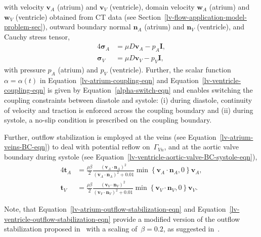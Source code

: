 \documentclass[3p]{elsarticle}
\begin{document}
with velocity $\boldsymbol{v}_A$ (atrium) and $\boldsymbol{v}_V$ (ventricle),
domain velocity $\boldsymbol{w}_A$ (atrium) and $\boldsymbol{w}_V$ (ventricle)
obtained from CT data (see Section~\ref{lv-flow-application-model-problem-sec}),
outward boundary normal $\boldsymbol{n}_A$ (atrium) and $\boldsymbol{n}_V$ (ventricle),
and Cauchy stress tensor,
\begin{alignat}{4}
    \boldsymbol{\sigma}_A
    &= \mu D \boldsymbol{v}_A - p_A \boldsymbol{I}, \\
    \boldsymbol{\sigma}_V
    &= \mu D \boldsymbol{v}_V - p_V \boldsymbol{I},
\end{alignat}
with pressure $p_A$ (atrium) and $p_V$ (ventricle).
Further, the scalar function $\alpha = \alpha (t)$ in Equation~\eqref{lv-atrium-coupling-eqn}
and Equation~\eqref{lv-ventricle-coupling-eqn}
is given by Equation~\eqref{alpha-switch-eqn}
and enables switching the coupling constraints between diastole and systole:
(i) during diastole, continuity of velocity and traction is enforced across the coupling boundary
and
(ii) during systole, a no-slip condition is prescribed on the coupling boundary.

Further, outflow stabilization is employed at the veins
(see Equation~\ref{lv-atrium-veins-BC-eqn}) to deal with potential reflow
on~$\Gamma_{Vn}$,
and at the aortic valve boundary during systole
(see Equation~\eqref{lv-ventricle-aortic-valve-BC-systole-eqn}),
\begin{alignat}{4}
    \boldsymbol{t}_A
    &= \frac{\rho \beta}{2}
        \frac{ \left( \boldsymbol{v}_A \cdot \boldsymbol{n}_A \right)^2 }{ \left( \boldsymbol{v}_A \cdot \boldsymbol{n}_A \right)^2 + 0.01}
        \min \left\{ \boldsymbol{v}_A \cdot \boldsymbol{n}_A, 0 \right\}
        \boldsymbol{v}_A, \label{lv-atrium-outflow-stabilization-eqn} \\
    \boldsymbol{t}_V
    &= \frac{\rho \beta}{2}
        \frac{ \left( \boldsymbol{v}_V \cdot \boldsymbol{n}_V \right)^2 }{ \left( \boldsymbol{v}_V \cdot \boldsymbol{n}_V \right)^2 + 0.01}
        \min \left\{ \boldsymbol{v}_V \cdot \boldsymbol{n}_V, 0 \right\}
        \boldsymbol{v}_V. \label{lv-ventricle-outflow-stabilization-eqn}
\end{alignat}

Note, that Equation~\eqref{lv-atrium-outflow-stabilization-eqn}
and Equation~\eqref{lv-ventricle-outflow-stabilization-eqn}
provide a modified version of the outflow stabilization proposed
in~\cite{BazilevsGoheanHughesMoserZhang2008}
with a scaling of~$\beta = 0.2$,
as suggested in~\cite{MoghadamBazilevsHsiaVignonclementelMarsden2011}.
\end{document}
